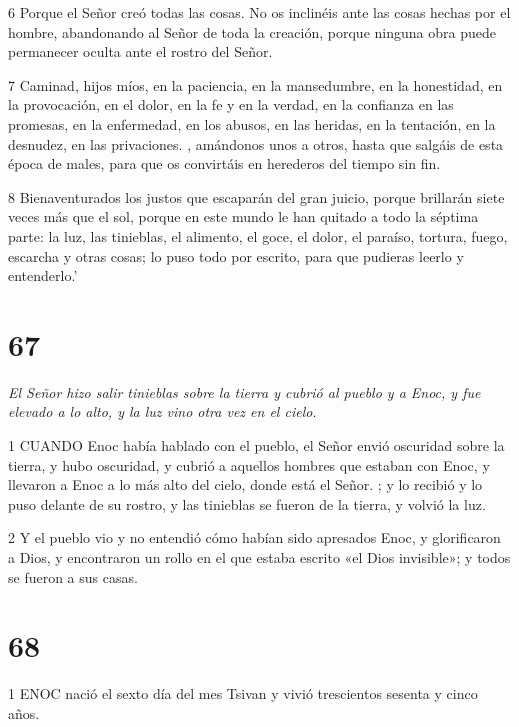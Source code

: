 \par 6 Porque el Señor creó todas las cosas. No os inclinéis ante las cosas hechas por el hombre, abandonando al Señor de toda la creación, porque ninguna obra puede permanecer oculta ante el rostro del Señor.

\par 7 Caminad, hijos míos, en la paciencia, en la mansedumbre, en la honestidad, en la provocación, en el dolor, en la fe y en la verdad, en la confianza en las promesas, en la enfermedad, en los abusos, en las heridas, en la tentación, en la desnudez, en las privaciones. , amándonos unos a otros, hasta que salgáis de esta época de males, para que os convirtáis en herederos del tiempo sin fin.

\par 8 Bienaventurados los justos que escaparán del gran juicio, porque brillarán siete veces más que el sol, porque en este mundo le han quitado a todo la séptima parte: la luz, las tinieblas, el alimento, el goce, el dolor, el paraíso, tortura, fuego, escarcha y otras cosas; lo puso todo por escrito, para que pudieras leerlo y entenderlo.'

\chapter{67}

\par \textit{El Señor hizo salir tinieblas sobre la tierra y cubrió al pueblo y a Enoc, y fue elevado a lo alto, y la luz vino otra vez en el cielo.}

\par 1 CUANDO Enoc había hablado con el pueblo, el Señor envió oscuridad sobre la tierra, y hubo oscuridad, y cubrió a aquellos hombres que estaban con Enoc, y llevaron a Enoc a lo más alto del cielo, donde está el Señor. ; y lo recibió y lo puso delante de su rostro, y las tinieblas se fueron de la tierra, y volvió la luz.

\par 2 Y el pueblo vio y no entendió cómo habían sido apresados ​​Enoc, y glorificaron a Dios, y encontraron un rollo en el que estaba escrito «el Dios invisible»; y todos se fueron a sus casas.

\chapter{68}

\par 1 ENOC nació el sexto día del mes Tsivan y vivió trescientos sesenta y cinco años.

